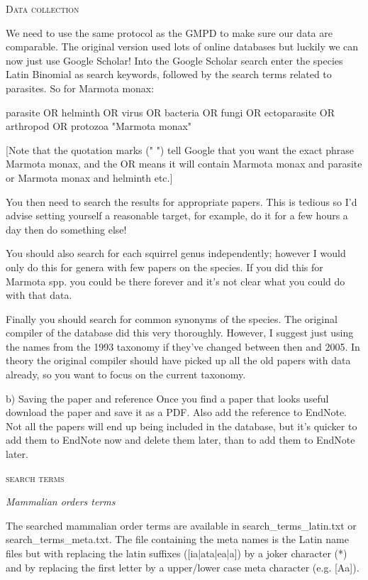 \documentclass[12pt,letterpaper]{article}
\renewcommand{\section}[1]{%
\bigskip
\begin{center}
\begin{Large}
\normalfont\scshape #1
\medskip
\end{Large}
\end{center}}
\renewcommand{\subsection}[1]{%
\bigskip
\begin{center}
\begin{large}
\normalfont\itshape #1
\end{large}
\end{center}}
\begin{document}
\section{Data collection}
We need to use the same protocol as the GMPD to make sure our data are comparable. The original version used lots of online databases but luckily we can now just use Google Scholar! Into the Google Scholar search enter the species Latin Binomial as search keywords, followed by the search terms related to parasites. So for Marmota monax:

parasite OR helminth OR virus OR bacteria OR fungi OR ectoparasite OR arthropod OR protozoa "Marmota monax"

[Note that the quotation marks (" ") tell Google that you want the exact phrase Marmota monax, and the OR means it will contain Marmota monax and parasite or Marmota monax and helminth etc.]

You then need to search the results for appropriate papers. This is tedious so I’d advise setting yourself a reasonable target, for example, do it for a few hours a day then do something else!

You should also search for each squirrel genus independently; however I would only do this for genera with few papers on the species. If you did this for Marmota spp. you could be there forever and it’s not clear what you could do with that data.

Finally you should search for common synonyms of the species. The original compiler of the database did this very thoroughly. However, I suggest just using the names from the 1993 taxonomy if they’ve changed between then and 2005. In theory the original compiler should have picked up all the old papers with data already, so you want to focus on the current taxonomy. 

b) Saving the paper and reference
Once you find a paper that looks useful download the paper and save it as a PDF. Also add the reference to EndNote. Not all the papers will end up being included in the database, but it’s quicker to add them to EndNote now and delete them later, than to add them to EndNote later.

\section{search terms}

\subsection{Mammalian orders terms}
The searched mammalian order terms are available in search_terms_latin.txt or search_terms_meta.txt. The file containing the meta names is the Latin name files but with replacing the latin suffixes ([ia|ata|ea|a]) by a joker character (*) and by replacing the first letter by a upper/lower case meta character (e.g. [Aa]).
\end{document}

